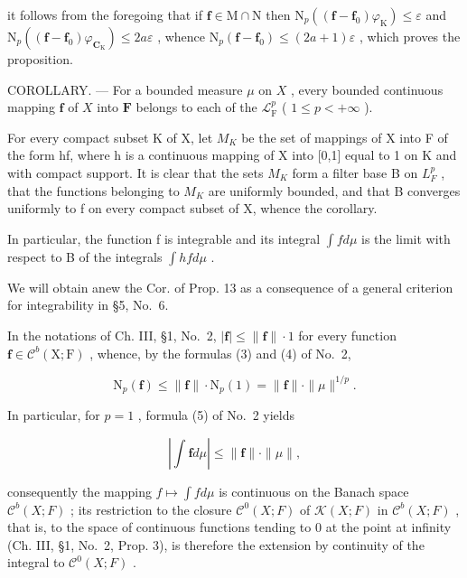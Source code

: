 it follows from the foregoing that if \(\mathbf{f} \in \mathrm{M} \cap \mathrm{N}\) then \(\mathrm{N}_p((\mathbf{f} - \mathbf{f}_0)\varphi_{\mathrm{K}}) \leqslant \varepsilon\) and \(\mathrm{N}_p((\mathbf{f} - \mathbf{f}_0)\varphi_{\mathbf{C}_{\mathrm{K}}}) \leqslant 2a\varepsilon\) , whence \(\mathrm{N}_p(\mathbf{f} - \mathbf{f}_0) \leqslant (2a + 1)\varepsilon\) , which proves the proposition.

COROLLARY. --- For a bounded measure \(\mu\) on \(X\) , every bounded continuous mapping \(\mathbf{f}\) of \(X\) into \(\mathbf{F}\) belongs to each of the \(\mathcal{L}_{\mathrm{F}}^{p}\) ( \(1 \leqslant p < +\infty\) ).

For every compact subset K of X, let \(M_{K}\) be the set of mappings of X into F of the form hf, where h is a continuous mapping of X into {[}0,1{]} equal to 1 on K and with compact support. It is clear that the sets \(M_{K}\) form a filter base B on \(L_{F}^{p}\) , that the functions belonging to \(M_{K}\) are uniformly bounded, and that B converges uniformly to f on every compact subset of X, whence the corollary.

In particular, the function f is integrable and its integral \(\int f d\mu\) is the limit with respect to B of the integrals \(\int h f d\mu\) .

We will obtain anew the Cor. of Prop. 13 as a consequence of a general criterion for integrability in §5, No.~6.

In the notations of Ch. III, §1, No.~2, \(|\mathbf{f}| \leqslant \| \mathbf{f} \| \cdot 1\) for every function \(\mathbf{f} \in \mathcal{C}^b(\mathrm{X};\mathrm{F})\) , whence, by the formulas (3) and (4) of No.~2,

\[
\mathrm{N} _ {p} (\mathbf {f}) \leqslant \| \mathbf {f} \| \cdot \mathrm{N} _ {p} (1) = \| \mathbf {f} \| \cdot \| \mu \| ^ {1 / p}.\tag{19}
\]

In particular, for \(p = 1\) , formula (5) of No.~2 yields

\[
\left| \int \mathbf {f} d \mu \right| \leqslant \| \mathbf {f} \| \cdot \| \mu \|,\tag{20}
\]

consequently the mapping \(f \mapsto \int f d\mu\) is continuous on the Banach space \(\mathcal{C}^{b}(X;F)\) ; its restriction to the closure \(\mathcal{C}^{0}(X;F)\) of \(\mathcal{K}(X;F)\) in \(\mathcal{C}^{b}(X;F)\) , that is, to the space of continuous functions tending to 0 at the point at infinity (Ch. III, §1, No.~2, Prop. 3), is therefore the extension by continuity of the integral to \(\mathcal{C}^{0}(X;F)\) .
\relax{}

